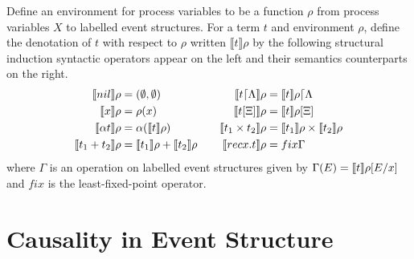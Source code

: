 \documentclass{article}
\begin{document}
\begin{definition}
    Define an environment for process variables to be a function $\rho$
    from process variables $X$ to labelled event structures.
    For a term $t$ and environment $\rho$, define the denotation of $t$ with
    respect to $\rho$ written $\llbracket t \rrbracket \rho$ by the following
    structural induction syntactic operators appear on the left and their
    semantics counterparts on the right.
    \begin{equation*}
        \begin{aligned}[c]
            \llbracket nil \rrbracket\rho       & = (\emptyset,\emptyset)         \\
            \llbracket x \rrbracket\rho         & = \rho(x)                       \\
            \llbracket \alpha t \rrbracket\rho  & = \alpha(\llbracket t \rrbracket\rho)           \\
            \llbracket t_1 + t_2 \rrbracket\rho & = \llbracket t_1 \rrbracket\rho + \llbracket t_2 \rrbracket\rho \\
        \end{aligned}
        \qquad
        \begin{aligned}[c]
            \llbracket t\lceil \Lambda \rrbracket\rho & = \llbracket t \rrbracket\rho \lceil \Lambda         \\
            \llbracket t[\Xi] \rrbracket\rho          & = \llbracket t \rrbracket\rho[\Xi]                   \\
            \llbracket t_1 \times t_2 \rrbracket\rho  & = \llbracket t_1 \rrbracket\rho \times \llbracket t_2 \rrbracket\rho \\
            \llbracket recx.t \rrbracket\rho          & = fix\Gamma                          \\
        \end{aligned}
    \end{equation*}
    where $\Gamma$ is an operation on labelled event structures given by
    $\Gamma(E) = \llbracket t \rrbracket\rho[E / x]$ and $fix$ is the least-fixed-point operator.
\end{definition}

\section{Causality in Event Structure}
\end{document}
